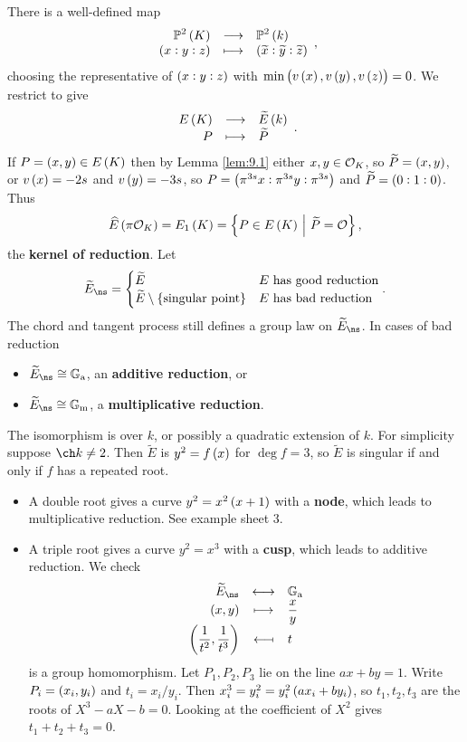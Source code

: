 \pagebreak

There is a well-defined map
$$ \function{\PP^2\br{K}}{\PP^2\br{k}}{\br{x : y : z}}{\br{\widetilde{x} : \widetilde{y} : \widetilde{z}}}, $$
choosing the representative of $ \br{x : y : z} $ with $ \min\br{v\br{x}, v\br{y}, v\br{z}} = 0 $. We restrict to give
$$ \function{E\br{K}}{\widetilde{E}\br{k}}{P}{\widetilde{P}}. $$
If $ P = \br{x, y} \in E\br{K} $ then by Lemma \ref{lem:9.1} either $ x, y \in \mathcal{O}_K $, so $ \widetilde{P} = \br{x, y} $, or $ v\br{x} = -2s $ and $ v\br{y} = -3s $, so $ P = \br{\pi^{3s}x : \pi^{3s}y : \pi^{3s}} $ and $ \widetilde{P} = \br{0 : 1 : 0} $. Thus
$$ \widehat{E}\br{\pi\OOO_K} = E_1\br{K} = \cbr{P \in E\br{K} \st \widetilde{P} = \OOO}, $$
the \textbf{kernel of reduction}. Let
$$ \widetilde{E}_{\ns} =
\begin{cases}
\widetilde{E} & E \ \text{has good reduction} \\
\widetilde{E} \setminus \cbr{\text{singular point}} & E \ \text{has bad reduction}
\end{cases}.
$$
The chord and tangent process still defines a group law on $ \widetilde{E}_{\ns} $. In cases of bad reduction
\begin{itemize}
\item $ \widetilde{E}_{\ns} \cong \GG_\a $, an \textbf{additive reduction}, or
\item $ \widetilde{E}_{\ns} \cong \GG_\m $, a \textbf{multiplicative reduction}.
\end{itemize}
The isomorphism is over $ k $, or possibly a quadratic extension of $ k $. For simplicity suppose $ \ch k \ne 2 $. Then $ \widetilde{E} $ is $ y^2 = f\br{x} $ for $ \deg f = 3 $, so $ \widetilde{E} $ is singular if and only if $ f $ has a repeated root.
\begin{itemize}
\item A double root gives a curve $ y^2 = x^2\br{x + 1} $ with a \textbf{node}, which leads to multiplicative reduction. See example sheet $ 3 $.
\item A triple root gives a curve $ y^2 = x^3 $ with a \textbf{cusp}, which leads to additive reduction. We check
$$ \bijection{\widetilde{E}_{\ns}}{\GG_\a}{\br{x, y}}{\dfrac{x}{y}}{\br{\dfrac{1}{t^2}, \dfrac{1}{t^3}}}{t} $$
is a group homomorphism. Let $ P_1, P_2, P_3 $ lie on the line $ ax + by = 1 $. Write $ P_i = \br{x_i, y_i} $ and $ t_i = x_i / y_i $. Then $ x_i^3 = y_i^2 = y_i^2\br{ax_i + by_i} $, so $ t_1, t_2, t_3 $ are the roots of $ X^3 - aX - b = 0 $. Looking at the coefficient of $ X^2 $ gives $ t_1 + t_2 + t_3 = 0 $.
\end{itemize}

